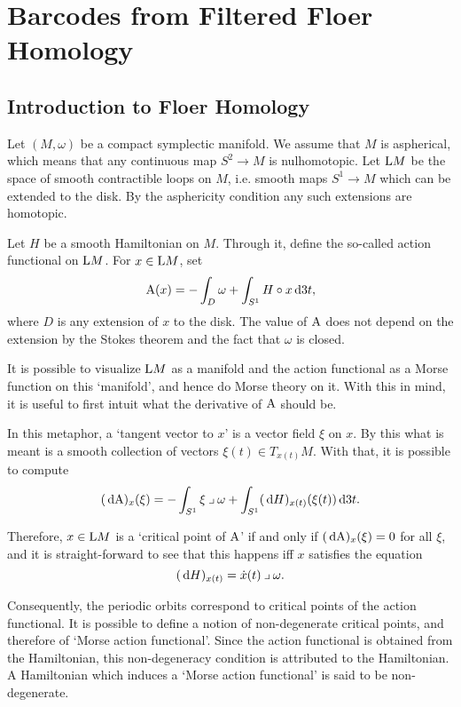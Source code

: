 \chapter{Barcodes from Filtered Floer Homology}\label{chap:bffh}

\section{Introduction to Floer Homology}

Let $(M, \omega)$ be a compact symplectic manifold. We assume that $M$ is aspherical, which means that any continuous map $S^2 \to M$ is nulhomotopic. Let $\LL M$ be the space of smooth contractible loops on $M$, i.e. smooth maps $S^1 \to M$ which can be extended to the disk. By the asphericity condition any such extensions are homotopic.

Let $H$ be a smooth Hamiltonian on $M$. Through it, define the so-called action functional on $\LL M$. For $x \in \LL M$, set
\begin{equation}
\AA(x) = - \int_D \omega + \int_{S^1} H \circ x \dl3 t,
\end{equation}
where $D$ is any extension of $x$ to the disk. The value of $\AA$ does not depend on the extension by the Stokes theorem and the fact that $\omega$ is closed.

It is possible to visualize $\LL M$ as a manifold and the action functional as a Morse function on this `manifold', and hence do Morse theory on it. With this in mind, it is useful to first intuit what the derivative of $\AA$ should be.

In this metaphor, a `tangent vector to $x$' is a vector field $\xi$ on $x$. By this what is meant is a smooth collection of vectors $\xi(t) \in T_{x(t)} M$. With that, it is possible to compute
\begin{equation}
 (\dl \AA)_x(\xi) = - \int_{S^1} \xi \into \omega + \int_{S^1} (\dl H)_{x(t)} (\xi(t)) \dl3t. 
\end{equation}

Therefore, $x\in \LL M$ is a `critical point of $\AA$' if and only if $(\dl \AA)_x(\xi) = 0$ for all $\xi$, and it is straight-forward to see that this happens iff $x$ satisfies the equation
\begin{equation}
(\dl H)_{x(t)} = \dot x(t) \into \omega.
\end{equation}

Consequently, the periodic orbits correspond to critical points of the action functional. It is possible to define a notion of non-degenerate critical points, and therefore of `Morse action functional'. Since the action functional is obtained from the Hamiltonian, this non-degeneracy condition is attributed to the Hamiltonian. A Hamiltonian which induces a `Morse action functional' is said to be non-degenerate.

